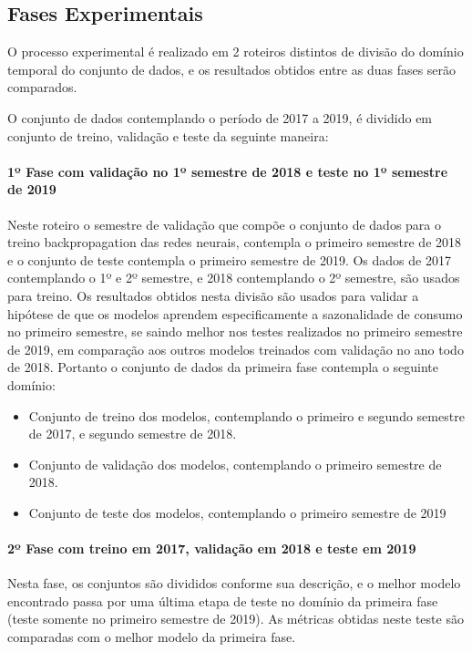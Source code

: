 \documentclass[	12pt, Times, openright, twoside, a4paper, english, brazil]{abntex2}
\begin{document}
    	\subsection{Fases Experimentais}
            O processo experimental é realizado em 2 roteiros distintos de divisão do domínio temporal do conjunto de dados, e os resultados obtidos entre as duas fases serão comparados.
            
            O conjunto de dados contemplando o período de 2017 a 2019, é dividido em conjunto de treino, validação e teste da seguinte maneira: 
            
            \paragraph{1º Fase com validação no 1º semestre de 2018 e teste no 1º semestre de 2019}
                Neste roteiro o semestre de validação que compõe o conjunto de dados para o treino backpropagation das redes neurais, contempla o primeiro semestre de 2018 e o conjunto de teste contempla o primeiro semestre de 2019.
                Os dados de 2017 contemplando o 1º e 2º semestre, e 2018 contemplando o 2º semestre, são usados para treino. Os resultados obtidos nesta divisão são usados para validar a hipótese de que os modelos aprendem especificamente a sazonalidade de consumo no primeiro semestre, se saindo melhor nos testes realizados no primeiro semestre de 2019, em comparação aos outros modelos treinados com validação no ano todo de 2018.
                Portanto o conjunto de dados da primeira fase contempla o seguinte domínio:
            \begin{itemize}
                    \item Conjunto de treino dos modelos, contemplando o primeiro e segundo semestre de 2017, e segundo semestre de 2018.
                    \item Conjunto de validação dos modelos, contemplando o primeiro semestre de 2018.
                    \item Conjunto de teste dos modelos, contemplando o primeiro semestre de 2019             
            \end{itemize}
            
            \paragraph{2º Fase com treino em 2017, validação em 2018 e teste em 2019}
                Nesta fase, os conjuntos são divididos conforme sua descrição, e o melhor modelo encontrado passa por uma última etapa de teste no domínio da primeira fase (teste somente no primeiro semestre de 2019).
                As métricas obtidas neste teste são comparadas com o melhor modelo da primeira fase.
    
\end{document}
